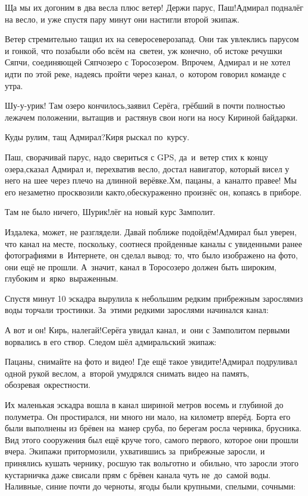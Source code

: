 \diagdash Ща мы их догоним в два весла плюс ветер! Держи парус, Паш!\mdash Адмирал подналёг на весло, и уже спустя пару минут они настигли второй экипаж.

Ветер стремительно тащил их на северо\sdash северо\sdash запад. Они так увлеклись парусом и гонкой, что позабыли обо всём на~свете\mdash и, уж конечно, об истоке речушки Сяпчи, соединяющей Сяпчозеро с Торосозером. Впрочем, Адмирал и не хотел идти по этой реке, надеясь пройти через канал, о~котором говорил команде с утра.

\diagdash Шу-у-урик! Там озеро кончилось,\mdash заявил Серёга, грёбший в почти полностью лежачем положении, вытащив и~растянув свои ноги на носу Кириной байдарки.

\diagdash Куды рулим, тащ Адмирал?\mdash Киря рыскал по~курсу.

\diagdash Паш, сворачивай парус, надо свериться с GPS, да~и~ветер стих к концу озера,\mdash сказал Адмирал и, перехватив весло, достал навигатор, который висел у него на шее через плечо на длинной верёвке.\mdash Хм, пацаны, а~канал\sdash то правее! Мы его незаметно просквозили как\sdash то,\mdash обескураженно произнёс он, копаясь в приборе.

\diagdash Там не было ничего, Шурик!\mdash лёг на новый курс Замполит.

\diagdash Издалека, может, не разглядели. Давай поближе подойдём!\mdash Адмирал был уверен, что канал на месте, поскольку, соотнеся пройденные каналы с увиденными ранее фотографиями в~Интернете, он сделал вывод: то, что было изображено на фото, они ещё не прошли.  А~значит, канал в Торосозеро должен быть широким, глубоким и~ярко~выраженным. 

Спустя минут 10 эскадра вырулила к небольшим редким прибрежным зарослям\mdash из воды торчали тростинки. За~этими редкими зарослями начинался канал:

\diagdash А вот и он! Кирь, налегай!\mdash Серёга увидал канал, и~они с Замполитом первыми ворвались в его створ. Следом шёл адмиральский экипаж:

\diagdash Пацаны, снимайте на фото и видео! Где ещё такое увидите!\mdash Адмирал подруливал одной рукой веслом, а~второй умудрялся снимать видео на память, обозревая~окрестности. 

Их маленькая эскадра вошла в канал шириной метров восемь и глубиной до полуметра. Он простирался, ни много ни мало, на километр вперёд. Борта его были выполнены из брёвен на~манер сруба, по берегам росла черника, брусника. Вид этого сооружения был ещё круче того, самого первого, которое они прошли вчера. Экипажи притормозили, ухватившись за~прибрежные заросли, и принялись кушать чернику, росшую так вольготно и~обильно, что заросли этого кустарничка даже свисали прям с брёвен канала чуть не~до~самой воды. Наливные, синие почти до черноты, ягоды были крупными, спелыми, сочными:


